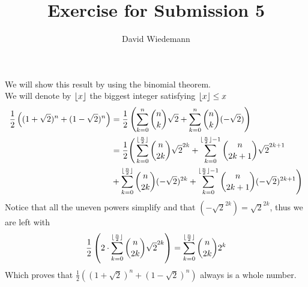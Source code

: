 \documentclass[11pt, a4paper, twoside]{article}
\DeclarePairedDelimiter\floor{\lfloor}{\rfloor}
\begin{document}
\title{Exercise for Submission 5}
\author{David Wiedemann}
\maketitle
We will show this result by using the binomial theorem.\\
We will denote by $\floor x$  the biggest integer satisfying $\floor x \leq x$
\begin{align*}
	\frac{1}{2} \left( ( 1+ \sqrt{2} )^{n} + ( 1- \sqrt{2} ) ^{n}	  \right) &= \frac{1}{2} \left( \sum_{k=0}^{n } \binom n k \sqrt{2} + \sum_{k=0}^{ n} \binom n k ( - \sqrt{2} )  \right)\\
		 &= \frac{1}{2} \Bigg( \sum_{k=0}^{ \floor { \frac{n}{2} }} \binom { n} { 2k} \sqrt{2}^{2k} + \sum_{k=0}^{ \floor { \frac{n}{2} }-1} \binom { n} { 2k+1} \sqrt{2}^{2k+1}\\
		 &+\sum_{k=0}^{ \floor { \frac{n}{2} }} \binom { n} { 2k}( - \sqrt{2} )^{2k} + \sum_{k=0}^{ \floor { \frac{n}{2} }-1} \binom { n} { 2k+1} (- \sqrt{2} )^{2k+1}   \Bigg) 
\end{align*}
Notice that all the uneven powers simplify and that $( - \sqrt{2} ^{2k}) = \sqrt{2} ^{2k}$, thus we are left with
\begin{align*}
	\frac{1}{2} \left( 2 \cdot\sum_{k=0}^{ \floor { \frac{n}{2} }} \binom { n} { 2k} \sqrt{2}^{2k} \right) &= \sum_{k=0}^{ \floor { \frac{n }{2}} } \binom n { 2k} 2 ^{k}	 \\
\end{align*}
Which proves that  $ \frac{1}{2} (  ( 1+ \sqrt{2} )^{n} + ( 1- \sqrt{2} )^{n}) $ always is a whole number.
\end{document}
